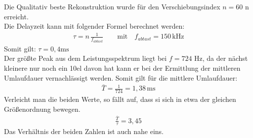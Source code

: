 Die Qualitativ beste Rekonstruktion wurde für den Verschiebungsindex $n= 60$ n erreicht.\\
Die Delayzeit kann mit folgender Formel berechnet werden: 
\begin{align}
    \tau = n \, \frac{1}{f_{abtast}} \qquad \text{mit} \quad f_{abtast} = 150 \, \text{kHz}
\end{align}
Somit gilt: $\tau = 0,4 \text{ms}$ \\

Der größte Peak aus dem Leistungsspektrum liegt bei $f=724$ Hz, da der nächst kleinere nur noch ein 10el davon hat kann er bei der Ermittlung der mittleren Umlaufdauer vernachlässigt werden. Somit gilt für die mittlere Umlaufdauer: 
\begin{align}
    \bar{T} = \frac{1}{724} = 1,38 \, \text{ms}
\end{align}
Verleicht man die beiden Werte, so fällt auf, dass si sich in etwa der gleichen Größenordnung bewegen.
\begin{align}
    \frac{\bar{T}}{\tau} = 3,45
\end{align}
Das Verhältnis der beiden Zahlen ist auch nahe eins.
